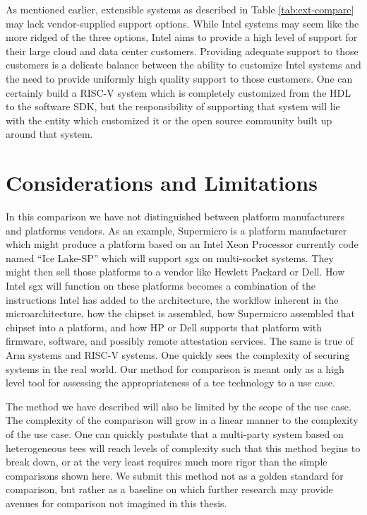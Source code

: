 As mentioned earlier, extensible systems as described in Table \ref{tab:ext-compare} may lack vendor-supplied support options. While Intel systems may seem like the more ridged of the three options, Intel aims to provide a high level of support for their large cloud and data center customers. Providing adequate support to those customers is a delicate balance between the ability to customize Intel systems and the need to provide uniformly high quality support to those customers. One can certainly build a RISC-V system which is completely customized from the HDL to the software SDK, but the responsibility of supporting that system will lie with the entity which customized it or the open source community built up around that system.

\renewcommand{\arraystretch}{1}


\section{Considerations and Limitations}

In this comparison we have not distinguished between platform manufacturers and platforms vendors. As an example, Supermicro is a platform manufacturer which might produce a platform based on an Intel Xeon Processor currently code named ``Ice Lake-SP'' which will support \gls{sgx} on multi-socket systems. They might then sell those platforms to a vendor like Hewlett Packard or Dell. How Intel \gls{sgx} will function on these platforms becomes a combination of the instructions Intel has added to the architecture, the workflow inherent in the microarchitecture, how the chipset is assembled, how Supermicro assembled that chipset into a platform, and how HP or Dell supports that platform with firmware, software, and possibly remote \gls{attestation} services. The same is true of Arm systems and RISC-V systems. One quickly sees the complexity of securing systems in the real world. Our method for comparison is meant only as a high level tool for assessing the appropriateness of a \gls{tee} technology to a use case.

The method we have described will also be limited by the scope of the use case. The complexity of the comparison will grow in a linear manner to the complexity of the use case. One can quickly postulate that a multi-party system based on heterogeneous \glspl{tee} will reach levels of complexity such that this method begins to break down, or at the very least requires much more rigor than the simple comparisons shown here. We submit this method not as a golden standard for comparison, but rather as a baseline on which further research may provide avenues for comparison not imagined in this thesis.
